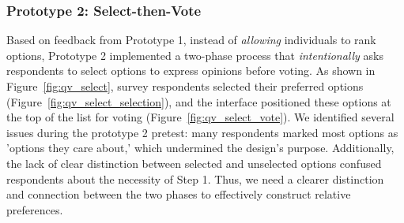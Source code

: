 \subsubsection{Prototype 2: Select-then-Vote}
Based on feedback from Prototype 1, instead of \textit{allowing} individuals to rank options, Prototype 2 implemented a two-phase process that \textit{intentionally} asks respondents to select options to express opinions before voting. As shown in Figure~\ref{fig:qv_select}, survey respondents selected their preferred options (Figure~\ref{fig:qv_select_selection}), and the interface positioned these options at the top of the list for voting (Figure~\ref{fig:qv_select_vote}). We identified several issues during the prototype 2 pretest: many respondents marked most options as 'options they care about,' which undermined the design's purpose. Additionally, the lack of clear distinction between selected and unselected options confused respondents about the necessity of Step 1. Thus, we need a clearer distinction and connection between the two phases to effectively construct relative preferences.

